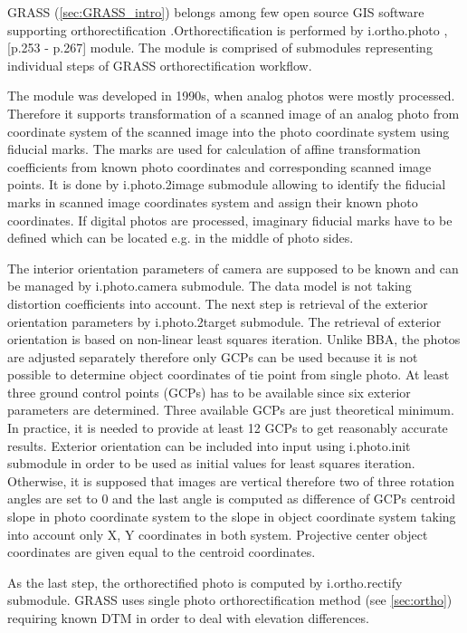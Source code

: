 \documentclass[a4paper,12pt]{article}
\begin{document}
GRASS (\ref{sec:GRASS_intro}) belongs among few open source GIS software supporting orthorectification
\cite{rocchini2012robust}.Orthorectification is performed 
by i.ortho.photo \cite{i.ortho.photo}, \cite{neteler2008open}[p.253 - p.267] module.
The module is comprised of submodules representing individual steps of 
GRASS orthorectification workflow.

The module was developed in 1990s,  
when analog photos were mostly processed. Therefore it supports 
 transformation of a scanned image of an analog photo from coordinate system of the scanned image into 
 the photo coordinate system using fiducial marks. The marks are used for calculation of 
 affine transformation coefficients from known photo coordinates 
 and corresponding scanned image points.
 It is done by i.photo.2image submodule allowing to identify the fiducial 
 marks in scanned image coordinates system and assign their known photo coordinates.
  If digital photos are processed, imaginary fiducial marks have to be defined which
can be located e.g. in the middle of photo sides.  
  
The interior orientation parameters of camera are supposed to be known and can 
be managed by i.photo.camera submodule.
The data model is not taking distortion 
coefficients into account. 
The next step is retrieval of the exterior orientation parameters by i.photo.2target submodule.  
The retrieval 
of exterior orientation is based on non-linear least squares iteration. Unlike BBA,
the photos are adjusted separately therefore only GCPs can be used
because it is not possible to determine object coordinates of tie point from single photo.
At least three ground control points (GCPs) has to be available since six exterior parameters are 
determined. Three available GCPs are just theoretical minimum. In practice, it is needed to provide at least 12 GCPs
to get reasonably accurate results. Exterior orientation 
can be included into input using i.photo.init submodule in order to be used as initial values for least squares iteration.
Otherwise, it is supposed that images are vertical therefore two of three rotation
angles are set to 0 and the last angle is computed as difference of GCPs centroid  slope
in photo coordinate system to the slope in object coordinate system taking into account only X, Y coordinates in both system.
Projective center object coordinates are given equal to the centroid coordinates.

As the last step, the orthorectified photo is computed by i.ortho.rectify submodule. GRASS uses single photo orthorectification
method (see \ref{sec:ortho}) requiring known DTM in order to deal with elevation differences. 
\end{document}
